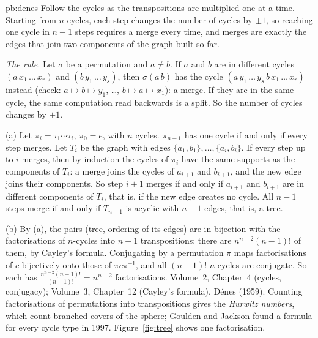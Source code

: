\begin{solution}{pb:denes}
\idea Follow the cycles as the transpositions are multiplied one at a time. Starting from $n$ cycles, each step changes the number
of cycles by $\pm1$, so reaching one cycle in $n-1$ steps requires a merge every time, and merges are exactly the edges that join two
components of the graph built so far.

\writeup \emph{The rule.} Let $\sigma$ be a permutation and $a\ne b$. If $a$ and $b$ are in different cycles
$(a\,x_1\,\dots\,x_r)$ and $(b\,y_1\,\dots\,y_s)$, then $\sigma(a\,b)$ has the cycle $(a\,y_1\,\dots\,y_s\,b\,x_1\,\dots\,x_r)$ instead (check:
$a\mapsto b\mapsto y_1$, \dots, $b\mapsto a\mapsto x_1$): a merge. If they are in the same cycle, the same computation read backwards is a
split. So the number of cycles changes by $\pm1$.

(a) Let $\pi_i=\tau_1\cdots\tau_i$, $\pi_0=e$, with $n$ cycles. $\pi_{n-1}$ has one cycle if and only if every step merges. Let $T_i$ be
the graph with edges $\{a_1,b_1\},\dots,\{a_i,b_i\}$. If every step up to $i$ merges, then by induction the cycles of $\pi_i$ have the
same supports as the components of $T_i$: a merge joins the cycles of $a_{i+1}$ and $b_{i+1}$, and the new edge joins their
components. So step $i+1$ merges if and only if $a_{i+1}$ and $b_{i+1}$ are in different components of $T_i$, that is, if the new
edge creates no cycle. All $n-1$ steps merge if and only if $T_{n-1}$ is acyclic with $n-1$ edges, that is, a tree.

(b) By (a), the pairs (tree, ordering of its edges) are in bijection with the factorisations of $n$-cycles into $n-1$
transpositions: there are $n^{n-2}(n-1)!$ of them, by Cayley's formula. Conjugating by a permutation $\pi$ maps factorisations of
$c$ bijectively onto those of $\pi c\pi^{-1}$, and all $(n-1)!$ $n$-cycles are conjugate. So each has $\frac{n^{n-2}(n-1)!}{(n-1)!}=n^{n-2}$
factorisations.
\tools Volume~2, Chapter~4 (cycles, conjugacy); Volume~3, Chapter~12 (Cayley's formula).
\leads Dénes (1959). Counting factorisations of permutations into transpositions gives the \emph{Hurwitz numbers}, which count
branched covers of the sphere; Goulden and Jackson found a formula for every cycle type in 1997. Figure~\ref{fig:tree} shows one
factorisation.
\end{solution}

